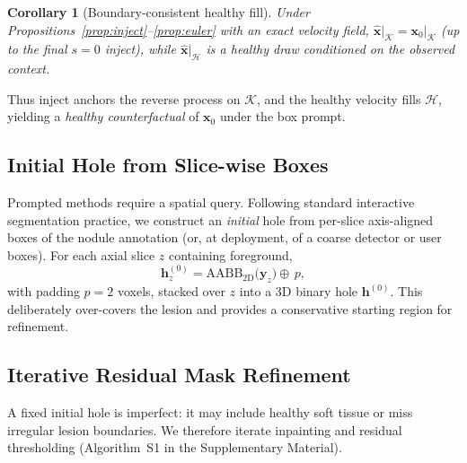 \documentclass[letterpaper]{article} %
\newtheorem{corollary}{Corollary}
\newcommand{\suppAlgRefine}{Algorithm~S1}
\begin{document}
\begin{corollary}[Boundary-consistent healthy fill]
\label{cor:inpaint}
Under Propositions~\ref{prop:inject}--\ref{prop:euler} with an exact
velocity field,
\(\hat{\mathbf{x}}\big|_{\mathcal{K}}=\mathbf{x}_0\big|_{\mathcal{K}}\)
(up to the final \(s{=}0\) inject), while
\(\hat{\mathbf{x}}\big|_{\mathcal{H}}\) is a healthy draw conditioned on
the observed context.
\end{corollary}

Thus inject anchors the reverse process on \(\mathcal{K}\), and the healthy
velocity fills \(\mathcal{H}\), yielding a \emph{healthy counterfactual} of
\(\mathbf{x}_0\) under the box prompt.

\subsection{Initial Hole from Slice-wise Boxes}
\label{sec:method:init}

Prompted methods require a spatial query.
Following standard interactive segmentation practice, we construct an
\emph{initial} hole from per-slice axis-aligned boxes of the nodule annotation
(or, at deployment, of a coarse detector or user boxes).
For each axial slice \(z\) containing foreground,
\begin{equation}
\mathbf{h}^{(0)}_z
=
\mathrm{AABB}_{2\mathrm{D}}\!\bigl(\mathbf{y}_z\bigr)
\oplus\, p,
\end{equation}
with padding \(p{=}2\) voxels, stacked over \(z\) into a 3D binary hole
\(\mathbf{h}^{(0)}\).
This deliberately over-covers the lesion and provides a conservative starting
region for refinement.

\subsection{Iterative Residual Mask Refinement}
\label{sec:method:refine}

A fixed initial hole is imperfect: it may include healthy soft tissue or miss
irregular lesion boundaries.
We therefore iterate inpainting and residual thresholding
(\suppAlgRefine{} in the Supplementary Material).
\end{document}
